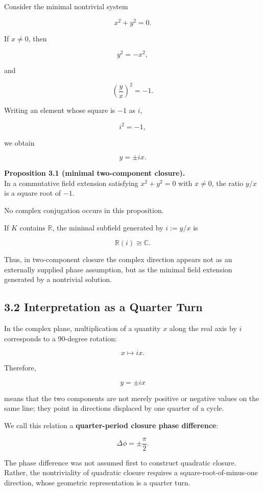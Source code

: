 \documentclass[
  a4paper,
  10pt]{article}
\begin{document}
Consider the minimal nontrivial system

\[
x^2+y^2=0.
\]

If \(x\neq0\), then

\[
y^2=-x^2,
\]

and

\[
\left(\frac{y}{x}\right)^2=-1.
\]

Writing an element whose square is \(-1\) as \(i\),

\[
i^2=-1,
\]

we obtain

\[
\boxed{
y=\pm ix
}.
\]

\textbf{Proposition 3.1 (minimal two-component closure).}\\
In a commutative field extension satisfying \(x^2+y^2=0\) with
\(x\neq0\), the ratio \(y/x\) is a square root of \(-1\).

No complex conjugation occurs in this proposition.

If \(K\) contains \(\mathbb R\), the minimal subfield generated by
\(i:=y/x\) is

\[
\mathbb R(i)\cong\mathbb C.
\]

Thus, in two-component closure the complex direction appears not as an
externally supplied phase assumption, but as the minimal field extension
generated by a nontrivial solution.

\subsection{3.2 Interpretation as a Quarter
Turn}\label{32-interpretation-as-a-quarter-turn}

In the complex plane, multiplication of a quantity \(x\) along the real
axis by \(i\) corresponds to a 90-degree rotation:

\[
x\longmapsto ix.
\]

Therefore,

\[
y=\pm ix
\]

means that the two components are not merely positive or negative values
on the same line; they point in directions displaced by one quarter of a
cycle.

We call this relation a \textbf{quarter-period closure phase
difference}:

\[
\Delta\phi=\pm\frac{\pi}{2}.
\]

The phase difference was not assumed first to construct quadratic
closure. Rather, the nontriviality of quadratic closure requires a
square-root-of-minus-one direction, whose geometric representation is a
quarter turn.
\end{document}
